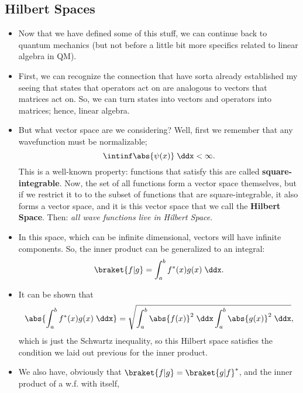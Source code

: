 \subsection*{Hilbert Spaces}

\begin{itemize}
    \item Now that we have defined some of this stuff, we can continue back to quantum mechanics (but not before a little bit more specifics related to linear algebra in QM). 
    \item First, we can recognize the connection that have sorta already established my seeing that states that operators act on are analogous to vectors that matrices act on. So, we can turn states into vectors and operators into matrices; hence, linear algebra.
    \item But what vector space are we considering? Well, first we remember that any wavefunction must be normalizable;
        \begin{equation*}
            \intinf \abs{\psi(x)} \;\ddx < \infty.
        \end{equation*}
        This is a well-known property: functions that satisfy this are called \textbf{square-integrable}. Now, the set of all functions form a vector space themselves, but if we restrict it to to the subset of functions that are square-integrable, it also forms a vector space, and it is this vector space that we call the \textbf{Hilbert Space}. Then: \textit{all wave functions live in Hilbert Space}.
    \item In this space, which can be infinite dimensional, vectors will have infinite components. So, the inner product can be generalized to an integral:
        \begin{equation*}
            \braket{f|g} = \int_a^b f^*(x)g(x)\;\ddx.
        \end{equation*}
    \item It can be shown that
        \begin{equation*}
            \abs{\int_a^b f^*(x)g(x)\;\ddx} = \sqrt{\int_a^b \abs{f(x)}^2\;\ddx\int_a^b \abs{g(x)}^2\;\ddx},
        \end{equation*}
        which is just the Schwartz inequality, so this Hilbert space satisfies the condition we laid out previous for the inner product.
    \item We also have, obviously that $\braket{f|g} = \braket{g|f}^*$, and the inner product of a w.f. with itself,
        \begin{equation*}

\end{equation*}
\end{itemize}
